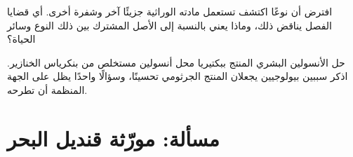 \begin{exercise}[$\star\star\star$]\label{exo:g10:universal-dna:14}
افترض أن نوعًا اكتشف تستعمل مادته الوراثية جزيئًا آخر وشفرة أخرى. أي
قضايا الفصل يناقض ذلك، وماذا يعني بالنسبة إلى الأصل المشترك بين ذلك
النوع وسائر الحياة؟
\end{exercise}

\begin{exercise}[$\star\star\star$]\label{exo:g10:universal-dna:15}
حل الأنسولين البشري المنتج ببكتيريا محل أنسولين مستخلص من بنكرياس
الخنازير. اذكر سببين بيولوجيين يجعلان المنتج الجرثومي تحسينًا، وسؤالًا
واحدًا يظل على الجهة المنظمة أن تطرحه.
\end{exercise}

\section{مسألة: مورّثة قنديل البحر}

